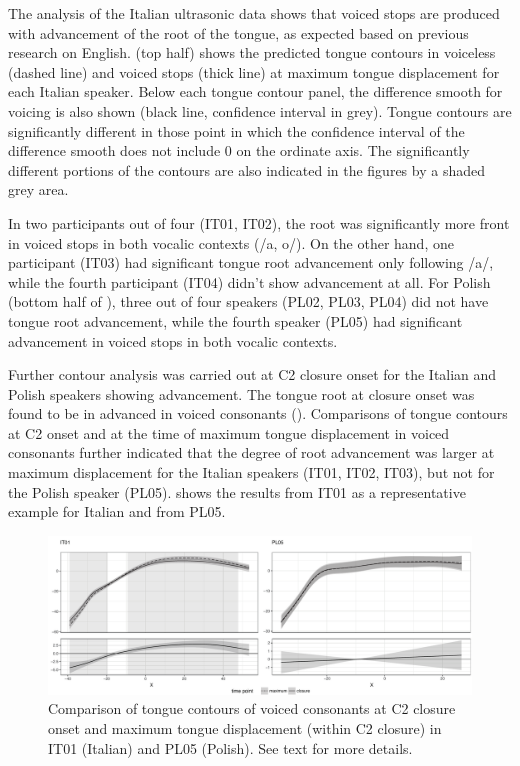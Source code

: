 \documentclass[authoryear, twocolumn]{elsarticle}
\begin{document}
The analysis of the Italian ultrasonic data shows that voiced stops are
produced with advancement of the root of the tongue, as expected based
on previous research on English.  (top half) shows the
predicted tongue contours in voiceless (dashed line) and voiced stops
(thick line) at maximum tongue displacement for each Italian speaker.
Below each tongue contour panel, the difference smooth for voicing is
also shown (black line, confidence interval in grey). Tongue contours
are significantly different in those point in which the confidence
interval of the difference smooth does not include 0 on the ordinate
axis. The significantly different portions of the contours are also
indicated in the figures by a shaded grey area.

In two participants out of four (IT01, IT02), the root was significantly
more front in voiced stops in both vocalic contexts (/a, o/). On the
other hand, one participant (IT03) had significant tongue root
advancement only following /a/, while the fourth participant (IT04)
didn't show advancement at all. For Polish (bottom half of
), three out of four speakers (PL02, PL03, PL04) did not
have tongue root advancement, while the fourth speaker (PL05) had
significant advancement in voiced stops in both vocalic contexts.

Further contour analysis was carried out at C2 closure onset for the
Italian and Polish speakers showing advancement. The tongue root at
closure onset was found to be in advanced in voiced consonants ().
Comparisons of tongue contours at C2 onset and at the time of maximum
tongue displacement in voiced consonants further indicated that the
degree of root advancement was larger at maximum displacement for the
Italian speakers (IT01, IT02, IT03), but not for the Polish speaker
(PL05).  shows the results from IT01 as a representative
example for Italian and from PL05.

\begin{figure}
    \centering
    \includegraphics[width=.9\textwidth]{fig/voiced.pdf}
    \caption{Comparison of tongue contours of voiced consonants at C2 closure onset and maximum tongue displacement (within C2 closure) in IT01 (Italian) and PL05 (Polish). See text for more details.}
    \label{f:voiced}
\end{figure}
\end{document}
